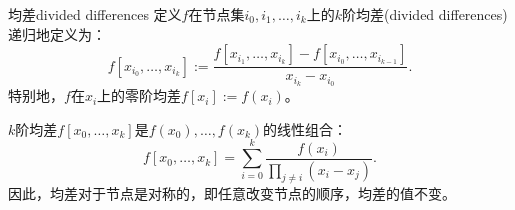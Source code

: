 \begin{definition}
    {均差}{divided differences}
    定义$f$在节点集$i_0,i_1,\ldots,i_k$上的$k$阶均差(divided differences)递归地定义为：
    \begin{equation}
        f[x_{i_0},\ldots,x_{i_k}]:=\frac{f[x_{i_1},\ldots,x_{i_k}]-f[x_{i_0},\ldots,x_{i_{k-1}}]}{x_{i_k}-x_{i_0}}.
    \end{equation}
    特别地，$f$在$x_i$上的零阶均差$f[x_i]:=f(x_i)$。
\end{definition}

\begin{corollary}
    $k$阶均差$f[x_0,\ldots,x_k]$是$f(x_0),\ldots,f(x_k)$的线性组合：
    \begin{equation}
        f[x_0,\ldots,x_k]=\sum_{i=0}^k\frac{f(x_i)}{\prod_{j\neq i}(x_i-x_j)}.
    \end{equation}
    因此，均差对于节点是对称的，即任意改变节点的顺序，均差的值不变。
\end{corollary}


